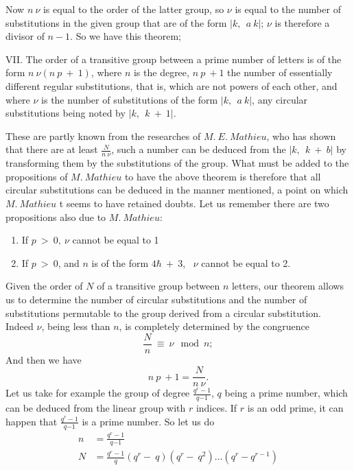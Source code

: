 \documentclass[11pt,fancy]{elegantbook}
\begin{document}
Now $n \ \nu$ is equal to the order of the latter group, so $\nu$ is equal to the number of substitutions in the given group that are of the form $|k, \ \ {a \ k}|$; $\nu$ is therefore a divisor of ${n -  1}$. So we have this theorem;
\begin{theorem}
VII. The order of a transitive group between a prime number of letters is of the form $n \ \nu{(n \ p \ + \ 1)}$, where $n$ is the degree, ${n \ p \ + 1}$ the number of essentially different regular substitutions, that is, which are not powers of each other, and where $\nu$ is the number of substitutions of the form  $|k, \ \ {a \ k}|$, any circular substitutions  being noted by $|k, \ \ {k \ + \ 1}|$.
\end{theorem}
These are partly known from the researches of $M.\ E. \ Mathieu$, who has shown that there are at least $\frac{N}{n \ \nu}$, such a number can be deduced from the $|k, \ \ {k \ + \ b}|$ by transforming them by the substitutions of the group. What must be added to the propositions of $M.\ Mathieu$ to have the above theorem is therefore that all circular substitutions can be deduced in the manner mentioned, a point on which $M.\ Mathieu$ t seems to have retained doubts.
Let us remember there are two propositions also due to $M.\ Mathieu$:
\begin{proposition}
\begin{enumerate}
    \item If $p \ > \ 0, \ {\nu}$ cannot be equal to 1
    \item If $p \ > \ 0$, and $n$ is of the form ${4\hbar \ + \ 3}$, \ $\nu$ cannot be equal to 2.
\end{enumerate}
\end{proposition}
Given the order of $N$ of a transitive group between $n$ letters, our theorem allows us to determine the number of circular substitutions and the number of substitutions permutable to the group derived from a circular substitution. Indeed $\nu$, being less than $n$, is completely determined by the congruence 
\begin{equation}
   \frac{N}{n} \ \equiv \ \nu \mod n;
\end{equation}
And then we have \begin{equation}
    {n \ p \ + 1=\frac{N}{n \ \nu}}.
\end{equation}
Let us take for example the group of degree $\frac{q^{r}-1}{q {- 1}}$, $q$ being a prime number, which can be deduced from the linear group with $r$ indices. If $r$ is an odd prime, it can happen that  $\frac{q^{r}-1}{q {- 1}}$ is a prime number. So let us do
\begin{equation}
\begin{aligned}
    n &=  \frac{q^{r}-1}{q{- 1}} \\
    N &=  \frac{q^{r}-1}{q } (q^r- \ q)(q^r- \ q^2) \dots (q^r-q^{r-1})
\end{aligned}
\end{equation}
\end{document}
